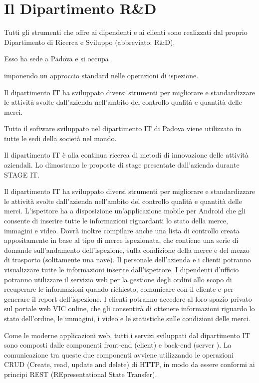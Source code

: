 \section{Il Dipartimento R\&D}
	Tutti gli strumenti che  \vic{} offre ai dipendenti e ai clienti sono realizzati dal proprio Dipartimento di Ricerca e Sviluppo (abbreviato: R\&D).
	
	Esso ha sede a Padova e si occupa
	
	
	imponendo un approccio standard nelle operazioni di ispezione.
	
	
	Il dipartimento IT ha sviluppato diversi strumenti per migliorare e standardizzare le
	attività svolte dall’azienda nell’ambito del controllo qualità e quantità delle merci.

		Tutto il software sviluppato nel dipartimento IT di Padova viene utilizzato in tutte le
	sedi della società nel mondo.
	
	Il dipartimento IT è alla continua ricerca di metodi di innovazione delle attività
	aziendali. Lo dimostrano le proposte di stage presentate dall’azienda durante STAGE
	IT. 
	
	
	Il dipartimento IT ha sviluppato diversi strumenti per migliorare e standardizzare le
	attività svolte dall’azienda nell’ambito del controllo qualità e quantità delle merci.
	L’ispettore ha a disposizione un’applicazione mobile per Android che gli consente di
	inserire tutte le informazioni riguardanti lo stato della merce, immagini e video. Dovrà
	inoltre compilare anche una lista di controllo creata appositamente in base al tipo di
	merce ispezionata, che contiene una serie di domande sull’andamento dell’ispezione,
	sulla condizione della merce e del mezzo di trasporto (solitamente una nave).
	Il personale dell’azienda e i clienti potranno visualizzare tutte le informazioni inserite
	dall’ispettore. I dipendenti d’ufficio potranno utilizzare il servizio web per la gestione
	degli ordini allo scopo di recuperare le informazioni quando richiesto, comunicare con il
	cliente e per generare il report dell’ispezione.
	I clienti potranno accedere al loro spazio privato sul portale web VIC online, che gli
	consentirà di ottenere informazioni riguardo lo stato dell’ordine, le immagini, i video e
	le statistiche sulle condizioni delle merci.
	
	Come le moderne applicazioni web, tutti i servizi sviluppati dal dipartimento IT sono
	composti dalle componenti front-end (client) e back-end (server ). La comunicazione tra
	queste due componenti avviene utilizzando le operazioni CRUD (Create, read, update
	and delete) di HTTP, in modo da essere conformi ai principi REST (REpresentational
	State Transfer).
	


